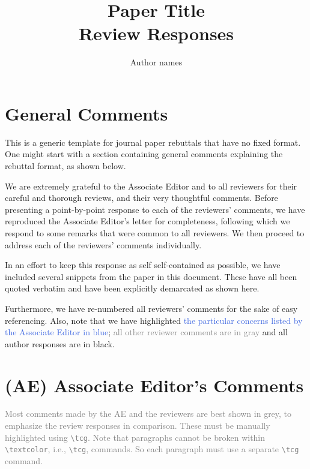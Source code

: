 \documentclass{article}
\title{Paper Title\\ Review Responses}
\author{Author names}
\newcommand{\tcg}[1]{\textcolor{Gray}{#1}}
\newcommand{\tcb}[1]{\textcolor{RoyalBlue}{#1}}
\begin{document}
\maketitle

\section*{General Comments}

This is a generic template for journal paper rebuttals that have no fixed format. One might start with a section containing general comments explaining the rebuttal format, as shown below.

We are extremely grateful to the Associate Editor and to all reviewers for their careful and thorough reviews, and their very thoughtful comments. Before presenting a point-by-point response to each of the reviewers' comments, we have reproduced the Associate Editor's letter for completeness, following which we respond to some remarks that were common to all reviewers. We then proceed to address each of the reviewers' comments individually.
\begin{quotn}
	In an effort to keep this response as self self-contained as possible, we have included several snippets from the paper in this document. These have all been quoted verbatim and have been explicitly demarcated as shown here.
\end{quotn}
Furthermore, we have re-numbered all reviewers' comments for the sake of easy referencing. Also, note that we have highlighted \tcb{the particular concerns listed by the Associate Editor in blue}; \tcg{all other reviewer comments are in gray} and all author responses are in black.

\section*{(AE) Associate Editor's Comments}

\tcg{Most comments made by the AE and the reviewers are best shown in grey, to emphasize the review responses in comparison. These must be manually highlighted using \texttt{\textbackslash{}tcg}. Note that paragraphs cannot be broken within \texttt{\textbackslash{}textcolor}, i.e., \texttt{\textbackslash{}tcg}, commands. So each paragraph must use a separate \texttt{\textbackslash{}tcg} command.}
\end{document}

